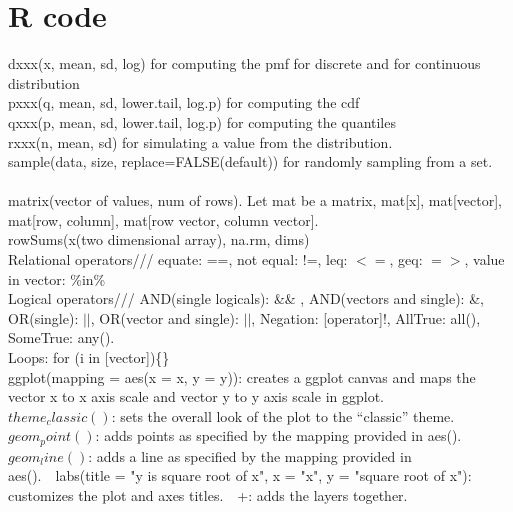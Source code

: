 \documentclass[5pt]{article}
\begin{document}
\section{R code}
dxxx(x, mean, sd, log) for computing the pmf for discrete and for continuous distribution\\
pxxx(q, mean, sd, lower.tail, log.p) for computing the cdf\\
qxxx(p, mean, sd, lower.tail, log.p) for computing the quantiles\\
rxxx(n, mean, sd) for simulating a value from the distribution.\\
sample(data, size, replace=FALSE(default)) for randomly sampling from a set.\\\\
matrix(vector of values, num of rows). Let mat be a matrix, mat[x], mat[vector], mat[row, column], mat[row vector, column vector].\\
rowSums(x(two dimensional array), na.rm, dims)\\
Relational operators/// equate: ==, not equal: !=, leq: $<=$, geq: $=>$, value in vector: \%in\%\\
Logical operators/// AND(single logicals): \&\& , AND(vectors and single): \&, OR(single): $\vert\vert$, OR(vector and single): $\vert\vert$, Negation: [operator]!, AllTrue: all(), SomeTrue: any().\\
Loops: for (i in [vector])\{\}\\
ggplot(mapping = aes(x = x, y = y)): creates a ggplot canvas and maps the vector x to x axis scale and vector y to y axis scale in ggplot.\\
$theme_classic()$: sets the overall look of the plot to the “classic” theme. \ \
$geom_point()$: adds points as specified by the mapping provided in aes().\ \
$geom_line()$: adds a line as specified by the mapping provided in aes().\ \
labs(title = "y is square root of x", x = "x", y = "square root of x"): customizes the plot and axes titles.\ \
+: adds the layers together.\\
\end{document}
